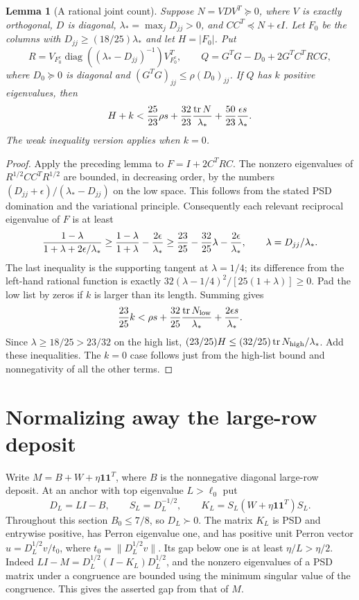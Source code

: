 \documentclass[11pt]{amsart}
\newtheorem{lemma}[theorem]{Lemma}
\theoremstyle{remark}\newtheorem{remark}[theorem]{Remark}
\newcommand{\one}{\mathbf1}
\begin{document}
\begin{lemma}[A rational joint count]\label{lem:newjoint}
Suppose $N=VDV^T\succeq0$, where $V$ is exactly orthogonal, $D$ is diagonal,
$\lambda_* =\max_jD_{jj}>0$, and
$CC^T\preceq N+\epsilon I$. Let $F_0$ be the columns with
$D_{jj}\ge(18/25)\lambda_*$ and let $H=|F_0|$. Put
\[
 R=V_{F_0^c}\operatorname{diag}((\lambda_*-D_{jj})^{-1})V_{F_0^c}^T,
 \qquad Q=G^TG-D_0+2G^TC^TRCG,
\]
where $D_0\succeq0$ is diagonal and $(G^TG)_{jj}\le\rho(D_0)_{jj}$.
If $Q$ has $k$ positive eigenvalues, then
\[
 H+k < {25\over23}\rho s+{32\over23}{\operatorname{tr}N\over\lambda_*}
            +{50\over23}{\epsilon s\over\lambda_*}.
\]
The weak inequality version applies when $k=0$.
\end{lemma}
\begin{proof}
Apply the preceding lemma to $F=I+2C^TRC$. The nonzero eigenvalues of
$R^{1/2}CC^TR^{1/2}$ are bounded, in decreasing order, by the numbers
$(D_{jj}+\epsilon)/(\lambda_*-D_{jj})$ on the low space.
This follows from the stated PSD domination and the variational principle.
Consequently each relevant reciprocal eigenvalue of $F$ is at least
\[
 {1-\lambda\over1+\lambda+2\epsilon/\lambda_*}
 \ge {1-\lambda\over1+\lambda}-{2\epsilon\over\lambda_*}
 \ge {23\over25}-{32\over25}\lambda-{2\epsilon\over\lambda_*},
 \qquad \lambda=D_{jj}/\lambda_*.
\]
The last inequality is the supporting tangent at $\lambda=1/4$;
its difference from the left-hand rational function is exactly
$32(\lambda-1/4)^2/[25(1+\lambda)]\ge0$.
Pad the low list by zeros if $k$ is larger than its length. Summing gives
\[
 {23\over25}k
 <\rho s+{32\over25}{\operatorname{tr}N_{\rm low}\over\lambda_*}
       +{2\epsilon s\over\lambda_*}.
\]
Since $\lambda\ge18/25>23/32$ on the high list,
$(23/25)H\le(32/25)\operatorname{tr}N_{\rm high}/\lambda_*$.
Add these inequalities. The $k=0$ case follows just from the high-list
bound and nonnegativity of all the other terms.
\end{proof}

\section{Normalizing away the large-row deposit}

Write $M=B+W+\eta\one\one^T$, where $B$ is the nonnegative diagonal
large-row deposit. At an anchor with top eigenvalue $L>\ell_0$ put
\[
 D_L=LI-B,\qquad S_L=D_L^{-1/2},\qquad
 K_L=S_L(W+\eta\one\one^T)S_L.
\]
Throughout this section $B_0\le7/8$, so $D_L\succ0$.
The matrix $K_L$ is PSD and entrywise positive, has Perron eigenvalue one,
and has positive unit Perron vector
$u=D_L^{1/2}v/t_0$, where $t_0=\|D_L^{1/2}v\|$.
Its gap below one is at least $\eta/L>\eta/2$.
Indeed $LI-M=D_L^{1/2}(I-K_L)D_L^{1/2}$, and the nonzero eigenvalues
of a PSD matrix under a congruence are bounded using the minimum singular
value of the congruence. This gives the asserted gap from that of $M$.
\end{document}
